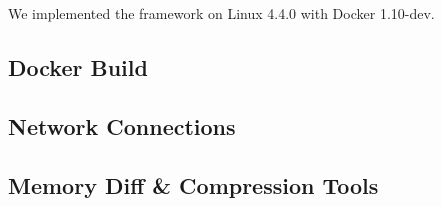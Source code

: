 

We implemented the framework on Linux 4.4.0 with Docker 1.10-dev. 


\subsection{Docker Build}

\subsection{Network Connections}

\subsection{Memory Diff \& Compression Tools}
